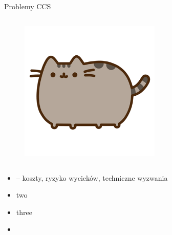 \begin{columnframe}{ Problemy CCS}
    \begin{column}{0.5\textwidth}
        \begin{figure}
            \centering
            \includegraphics[width=0.6\textwidth, frame]{images/pusheen.png}
        \end{figure}
    \end{column}
    \begin{column}{0.5\textwidth}
        \begin{itemize}
            \item  – koszty, ryzyko wycieków, techniczne wyzwania
            \item two \MeV
            \item three \GeV
            \item \aegis
        \end{itemize}
    \end{column}
\end{columnframe}

